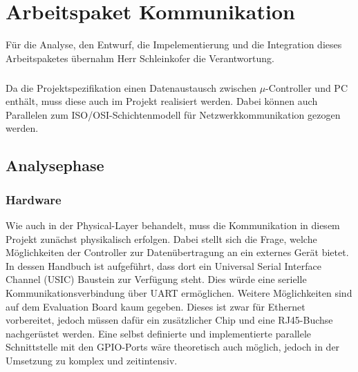 \graphicspath{{./communication/}}
\chapter{Arbeitspaket Kommunikation}
Für die Analyse, den Entwurf, die Impelementierung und die Integration dieses Arbeitspaketes übernahm Herr Schleinkofer die Verantwortung.
\paragraph{}
Da die Projektspezifikation einen Datenaustausch zwischen $\mu$-Controller und PC enthält, muss diese auch im Projekt realisiert werden. Dabei können auch Parallelen zum ISO/OSI-Schichtenmodell für Netzwerkkommunikation gezogen werden.
\section{Analysephase}
\subsection{Hardware}
Wie auch in der Physical-Layer behandelt, muss die Kommunikation in diesem Projekt zunächst physikalisch erfolgen. 
Dabei stellt sich die Frage, welche Möglichkeiten der Controller zur Datenübertragung an ein externes Gerät bietet. In dessen Handbuch ist aufgeführt, dass dort ein Universal Serial Interface Channel (USIC) Baustein zur Verfügung steht. Dies würde eine serielle Kommunikationsverbindung über UART ermöglichen. Weitere Möglichkeiten sind auf dem Evaluation Board kaum gegeben. Dieses ist zwar für Ethernet vorbereitet, jedoch müssen dafür ein zusätzlicher Chip und eine RJ45-Buchse nachgerüstet werden. Eine selbst definierte und implementierte parallele Schnittstelle mit den GPIO-Ports wäre theoretisch auch möglich, jedoch in der Umsetzung zu komplex und zeitintensiv.
